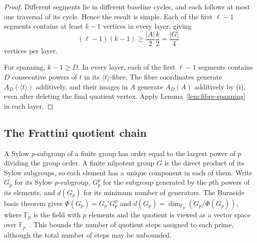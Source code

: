 \documentclass[11pt,a4paper,reqno]{amsart}
\theoremstyle{definition}
\theoremstyle{remark}
\numberwithin{equation}{section}
\newcommand{\F}{\mathbb F}
\newcommand{\gen}[1]{\langle #1\rangle}
\begin{document}
\begin{proof}
Different segments lie in different baseline cycles, and each follows at most one traversal of its cycle. Hence the result is simple. Each of the first $\ell-1$ segments contains at least $k-1$ vertices in every layer, giving
\[
 (\ell-1)(k-1)\ge\frac{|A|}{2}\frac{k}{2}=\frac{|G|}{4}
\]
vertices per layer.

For spanning, $k-1\ge D$. In every layer, each of the first $\ell-1$ segments contains $D$ consecutive powers of $t$ in its $\gen t$-fibre. The fibre coordinates generate $A_D(\gen t)$ additively, and their images in $A$ generate $A_D(A)$ additively by (i), even after deleting the final quotient vertex. Apply Lemma~\ref{lem:fibre-spanning} in each layer.
\end{proof}

\subsection{The Frattini quotient chain}\label{subsec:frattini}
A Sylow $p$-subgroup of a finite group has order equal to the largest power of $p$ dividing the group order. A finite nilpotent group $G$ is the direct product of its Sylow subgroups, so each element has a unique component in each of them. Write $G_p$ for its Sylow $p$-subgroup, $G_p^p$ for the subgroup generated by the $p$th powers of its elements, and $d(G_p)$ for its minimum number of generators. The Burnside basis theorem gives $\Phi(G_p)=G_p'G_p^p$ and $d(G_p)=\dim_{\F_p}(G_p/\Phi(G_p))$, where $\F_p$ is the field with $p$ elements and the quotient is viewed as a vector space over $\F_p$~\cite[Theorem 5.3.2]{Robinson}. This bounds the number of quotient steps assigned to each prime, although the total number of steps may be unbounded.
\end{document}
